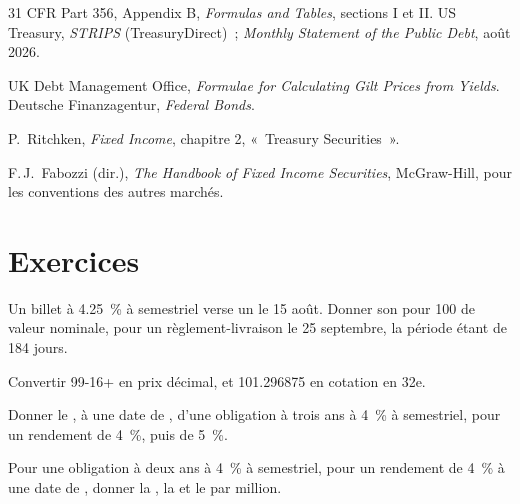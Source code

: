 \begin{omsources}
\item 31 CFR Part 356, Appendix B, \emph{Formulas and Tables}, sections I et
II. US Treasury, \emph{STRIPS} (TreasuryDirect)~; \emph{Monthly Statement of
the Public Debt}, août 2026.
\item UK Debt Management Office, \emph{Formulae for Calculating Gilt Prices from Yields}. Deutsche Finanzagentur, \emph{Federal Bonds}.
\item P.\ Ritchken, \emph{Fixed Income}, chapitre 2, «~Treasury Securities~».
\item F.\,J.\ Fabozzi (dir.), \emph{The Handbook of Fixed Income Securities},
McGraw-Hill, pour les conventions des autres marchés.
\end{omsources}

\section{Exercices}

\begin{exercise}[$\star$]\label{exo:m2:government-bonds:1}
Un billet à 4.25~\% à  semestriel verse un  le 15 août. Donner son 
pour 100 de valeur nominale, pour un règlement-livraison le 25 septembre, la période étant de 184 jours.
\end{exercise}

\begin{exercise}[$\star$]\label{exo:m2:government-bonds:2}
Convertir 99-16+ en prix décimal, et 101.296875 en cotation en 32e.
\end{exercise}

\begin{exercise}[$\star$]\label{exo:m2:government-bonds:3}
Donner le , à une date de , d'une obligation à trois ans à 4~\% à  semestriel,
pour un rendement de 4~\%, puis de 5~\%.
\end{exercise}

\begin{exercise}[$\star\star$]\label{exo:m2:government-bonds:4}
Pour une obligation à deux ans à 4~\% à  semestriel, pour un rendement de 4~\% à une date de , donner
la , la  et le  par million.
\end{exercise}

